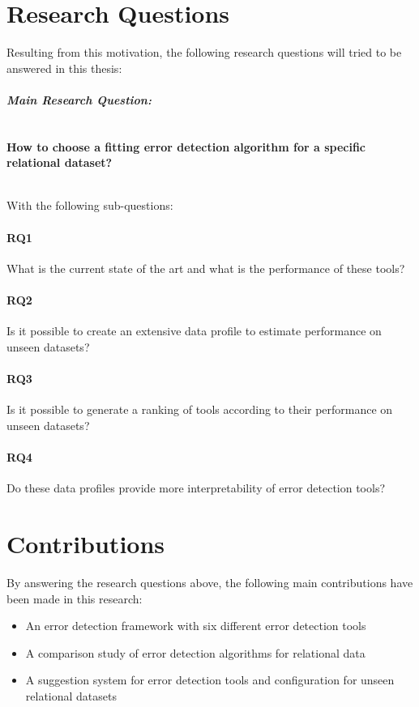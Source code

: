 \section{Research Questions}
\label{sec:researchquestions}
Resulting from this motivation, the following research questions will tried to be answered in this thesis:

\paragraph{\textit{Main Research Question:}} 
~\\\textbf{How to choose a fitting error detection algorithm for a specific relational dataset?}

~\\With the following sub-questions:
\paragraph{RQ1} What is the current state of the art and what is the performance of these tools?

\paragraph{RQ2} Is it possible to create an extensive data profile to estimate performance on unseen datasets?

\paragraph{RQ3} Is it possible to generate a ranking of tools according to their performance on unseen datasets?

\paragraph{RQ4} Do these data profiles provide more interpretability of error detection tools?

\section{Contributions}
\label{sec:contributions}
By answering the research questions above, the following main contributions have been made in this research:

\begin{itemize}
    \item An error detection framework with six different error detection tools
    \item A comparison study of error detection algorithms for relational data
    \item A suggestion system for error detection tools and configuration for unseen relational datasets
\end{itemize}

